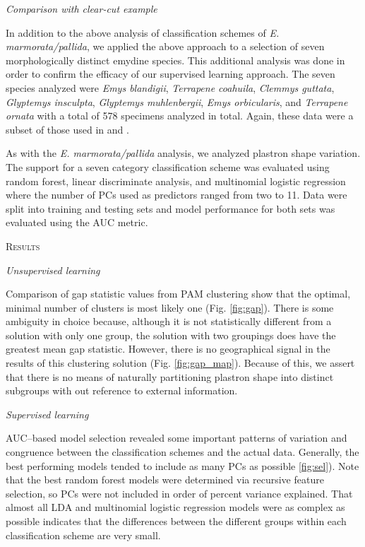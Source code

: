 \documentclass[12pt,letterpaper]{article}
\renewcommand{\section}[1]{%
\bigskip
\begin{center}
\begin{Large}
\normalfont\scshape #1
\medskip
\end{Large}
\end{center}}
\renewcommand{\subsection}[1]{%
\bigskip
\begin{center}
\begin{large}
\normalfont\itshape #1
\end{large}
\end{center}}
\begin{document}
\subsection{Comparison with clear-cut example}
In addition to the above analysis of classification schemes of \textit{E. marmorata/pallida}, we applied the above approach to a selection of seven morphologically distinct emydine species. This additional analysis was done in order to confirm the efficacy of our supervised learning approach. The seven species analyzed were \textit{Emys blandigii}, \textit{Terrapene coahuila}, \textit{Clemmys guttata}, \textit{Glyptemys insculpta}, \textit{Glyptemys muhlenbergii}, \textit{Emys orbicularis}, and \textit{Terrapene ornata} with a total of 578 specimens analyzed in total. Again, these data were a subset of those used in \citet{Angielczyk2011} and \citet{Angielczyk2013a}.

As with the \textit{E. marmorata/pallida} analysis, we analyzed plastron shape variation. The support for a seven category classification scheme was evaluated using random forest, linear discriminate analysis, and multinomial logistic regression where the number of PCs used as predictors ranged from two to 11. Data were split into training and testing sets and model performance for both sets was evaluated using the AUC metric.


\section{Results}

\subsection{Unsupervised learning}
Comparison of gap statistic values from PAM clustering show that the optimal, minimal number of clusters is most likely one (Fig. \ref{fig:gap}). There is some ambiguity in choice because, although it is not statistically different from a solution with only one group, the solution with two groupings does have the greatest mean gap statistic. However, there is no geographical signal in the results of this clustering solution (Fig. \ref{fig:gap_map}). Because of this, we assert that there is no means of naturally partitioning plastron shape into distinct subgroups with out reference to external information.

\subsection{Supervised learning}
AUC--based model selection revealed some important patterns of variation and congruence between the classification schemes and the actual data. Generally, the best performing models tended to include as many PCs as possible \ref{fig:sel}). Note that the best random forest models were determined via recursive feature selection, so PCs were not included in order of percent variance explained. That almost all LDA and multinomial logistic regression models were as complex as possible indicates that the differences between the different groups within each classification scheme are very small.
\end{document}
